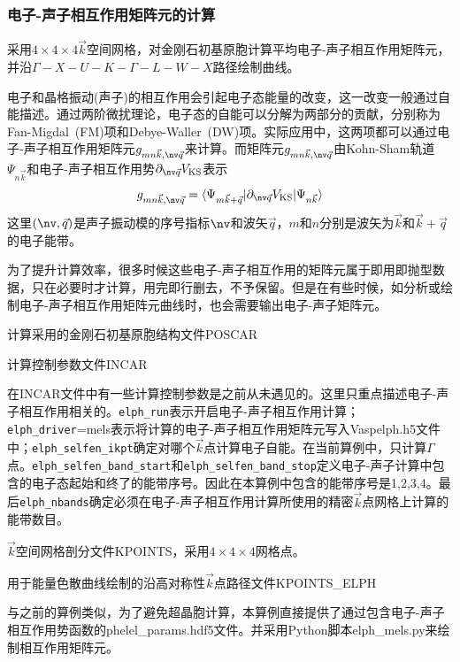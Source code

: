{\subsubsection{电子-声子相互作用矩阵元的计算}
采用$4\times4\times4$$\vec k$空间网格，对金刚石初基原胞计算平均电子-声子相互作用矩阵元，并沿$\Gamma-X-U-K-\Gamma-L-W-X$路径绘制曲线。

电子和晶格振动(声子)的相互作用会引起电子态能量的改变，这一改变一般通过自能描述。通过两阶微扰理论，电子态的自能可以分解为两部分的贡献，分别称为\textrm{Fan-Migdal~(FM)}项和\textrm{Debye-Waller~(DW)}项。实际应用中，这两项都可以通过电子-声子相互作用矩阵元$g_{mn\vec k,\nv\vec q}$来计算。而矩阵元$g_{mn\vec k,\nv\vec q}$由\textrm{Kohn-Sham}轨道$\Psi_{n\vec k}$和电子-声子相互作用势$\partial_{\nv\vec q}V_{\mathrm{KS}}$表示
\begin{displaymath}
	g_{mn\vec k,\nv\vec q}=\langle\Psi_{m\vec k+\vec q}|\partial_{\nv\vec q}V_{\mathrm{KS}}|\Psi_{n\vec k}\rangle
\end{displaymath}
这里$(\nv,\vec q)$是声子振动模的序号指标$\nv$和波矢$\vec q$，$m$和$n$分别是波矢为$\vec k$和$\vec k+\vec q$的电子能带。

为了提升计算效率，很多时候这些电子-声子相互作用的矩阵元属于即用即抛型数据，只在必要时才计算，用完即行删去，不予保留。但是在有些时候，如分析或绘制电子-声子相互作用矩阵元曲线时，也会需要输出电子-声子矩阵元。


计算采用的金刚石初基原胞结构文件\textrm{POSCAR}

计算控制参数文件\textrm{INCAR}

在\textrm{INCAR}文件中有一些计算控制参数是之前从未遇见的。这里只重点描述电子-声子相互作用相关的。\texttt{elph\_run}表示开启电子-声子相互作用计算；\texttt{elph\_driver}=\textrm{mels}表示将计算的电子-声子相互作用矩阵元写入\textrm{Vaspelph.h5}文件中；\texttt{elph\_selfen\_ikpt}确定对哪个$\vec k$点计算电子自能。在当前算例中，只计算$\Gamma$点。\texttt{elph\_selfen\_band\_start}和\texttt{elph\_selfen\_band\_stop}定义电子-声子计算中包含的电子态起始和终了的能带序号。因此在本算例中包含的能带序号是1,2,3,4。最后\texttt{elph\_nbands}确定必须在电子-声子相互作用计算所使用的精密$\vec k$点网格上计算的能带数目。

$\vec k$空间网格剖分文件\textrm{KPOINTS}，采用$4\times4\times4$网格点。

用于能量色散曲线绘制的沿高对称性$\vec k$点路径文件\textrm{KPOINTS\_ELPH}

与之前的算例类似，为了避免超晶胞计算，本算例直接提供了通过包含电子-声子相互作用势函数的\textrm{phelel\_params.hdf5}文件。并采用\textrm{Python}脚本\textrm{elph\_mels.py}来绘制相互作用矩阵元。%

}
